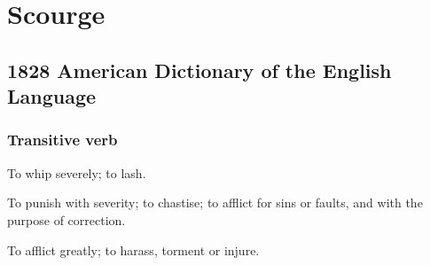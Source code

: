 \section{Scourge}
	\label{SCOURGE}
	

\subsection{1828 American Dictionary of the English Language} %
	\label{SCOURGE-1828}
	
	\subsubsection{Transitive verb}
		\label{SCOURGE-1828-transverb}

	\begin{compactitem}
		\item[1] To whip severely; to lash.
		\item[2] To punish with severity; to chastise; to afflict for sins or faults, and with the purpose of correction.
		\item[3] To afflict greatly; to harass, torment or injure.
	\end{compactitem}




